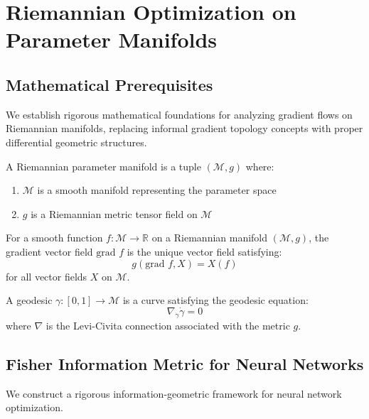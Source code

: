 \chapter{Riemannian Optimization on Parameter Manifolds}

\section{Mathematical Prerequisites}

We establish rigorous mathematical foundations for analyzing gradient flows on Riemannian manifolds, replacing informal gradient topology concepts with proper differential geometric structures.

\begin{definition}
\label{def:riemannian_parameter_manifold}
A Riemannian parameter manifold is a tuple $(\mathcal{M}, g)$ where:
\begin{enumerate}
\item $\mathcal{M}$ is a smooth manifold representing the parameter space
\item $g$ is a Riemannian metric tensor field on $\mathcal{M}$
\end{enumerate}
\end{definition}

\begin{definition}
\label{def:gradient_vector_field}
For a smooth function $f: \mathcal{M} \to \mathbb{R}$ on a Riemannian manifold $(\mathcal{M}, g)$, the gradient vector field $\text{grad } f$ is the unique vector field satisfying:
$$g(\text{grad } f, X) = X(f)$$
for all vector fields $X$ on $\mathcal{M}$.
\end{definition}

\begin{definition}
\label{def:geodesics}
A geodesic $\gamma: [0,1] \to \mathcal{M}$ is a curve satisfying the geodesic equation:
$$\nabla_{\dot{\gamma}} \dot{\gamma} = 0$$
where $\nabla$ is the Levi-Civita connection associated with the metric $g$.
\end{definition}

\section{Fisher Information Metric for Neural Networks}

We construct a rigorous information-geometric framework for neural network optimization.

